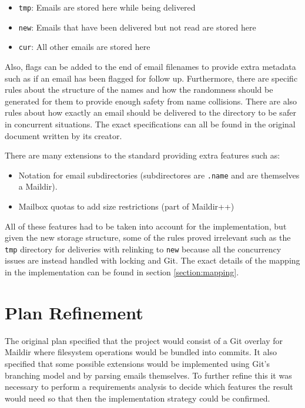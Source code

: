 \begin{itemize}
\item \texttt{tmp}: Emails are stored here while being delivered
\item \texttt{new}: Emails that have been delivered but not read are stored here
\item \texttt{cur}: All other emails are stored here
\end{itemize}

Also, flags can be added to the end of email filenames to provide extra metadata such as if an email has been flagged for follow up. Furthermore, there are specific rules about the structure of the names and how the randomness should be generated for them to provide enough safety from name collisions. There are also rules about how exactly an email should be delivered to the directory to be safer in concurrent situations. The exact specifications can all be found in the original document written by its creator\cite{bernstein2000maildir}.

There are many extensions to the standard providing extra features such as:

\begin{itemize}
\item Notation for email subdirectories (subdirectores are \texttt{.name} and are themselves a Maildir).
\item Mailbox quotas to add size restrictions (part of Maildir++)
\end{itemize}

All of these features had to be taken into account for the implementation, but given the new storage structure, some of the rules proved irrelevant such as the \texttt{tmp} directory for deliveries with relinking to \texttt{new} because all the concurrency issues are instead handled with locking and Git. The exact details of the mapping in the implementation can be found in section \ref{section:mapping}.

\section{Plan Refinement}

The original plan specified that the project would consist of a Git overlay for Maildir where filesystem operations would be bundled into commits. It also specified that some possible extensions would be implemented using Git's branching model and by parsing emails themselves. To further refine this it was necessary to perform a requirements analysis to decide which features the result would need so that then the implementation strategy could be confirmed.

